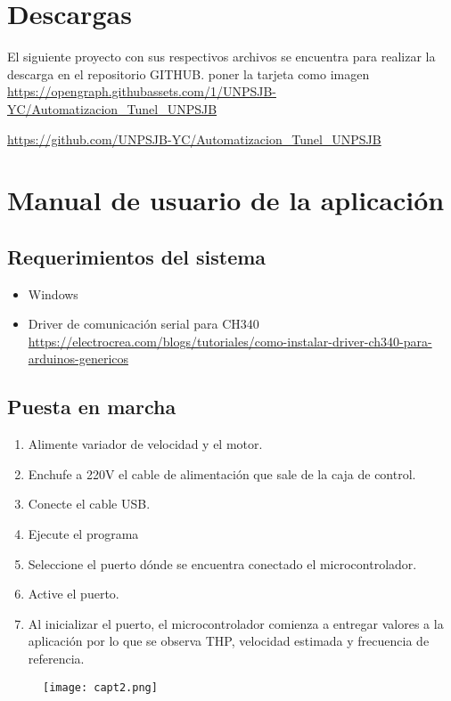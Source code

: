\section{Descargas}
El siguiente proyecto con sus respectivos archivos se encuentra para realizar la descarga en el repositorio GITHUB.
poner la tarjeta como imagen
\url{https://opengraph.githubassets.com/1/UNPSJB-YC/Automatizacion_Tunel_UNPSJB}

\url{https://github.com/UNPSJB-YC/Automatizacion_Tunel_UNPSJB}
\newpage
\section{Manual de usuario de la aplicación}
\subsection{Requerimientos del sistema}
\begin{itemize}
	\item Windows
	\item Driver de comunicación serial para CH340 \url{https://electrocrea.com/blogs/tutoriales/como-instalar-driver-ch340-para-arduinos-genericos}
\end{itemize}


\subsection{Puesta en marcha}
\begin{enumerate}
	\item Alimente variador de velocidad y el motor.
	\item Enchufe a 220V el cable de alimentación que sale de la caja de control.
	\item Conecte el cable USB.
	\item Ejecute el programa 
	\item Seleccione el puerto dónde se encuentra conectado el microcontrolador.
	\item Active el puerto.
	\item Al inicializar el puerto, el microcontrolador comienza a entregar valores a la aplicación por lo que se observa THP, velocidad estimada y frecuencia de referencia. 
	
\end{enumerate}

\begin{figure}[H]
	\centering
	\texttt{[image: capt2.png]}
	\label{fig:capt2}
\end{figure}



